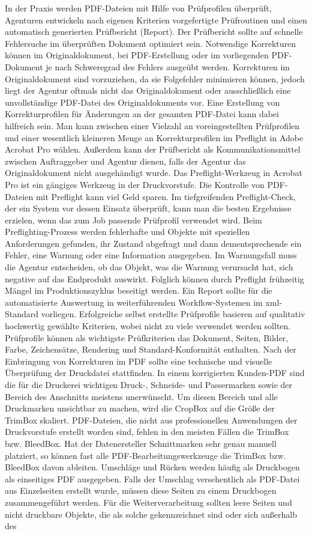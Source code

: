 In der Praxis werden PDF-Dateien mit Hilfe von Prüfprofilen überprüft, Agenturen entwickeln nach eigenen Kriterien vorgefertigte Prüfroutinen und einen automatisch generierten Prüfbericht (Report). Der Prüfbericht sollte auf schnelle Fehlersuche im überprüften Dokument optimiert sein. Notwendige Korrekturen können im Originaldokument, bei PDF-Erstellung oder im vorliegenden PDF-Dokument je nach Schweregrad des Fehlers ausgeübt werden. Korrekturen im Originaldokument sind vorzuziehen, da sie Folgefehler minimieren können, jedoch liegt der Agentur oftmals nicht das Originaldokument oder ausschließlich eine unvollständige PDF-Datei des Originaldokuments vor. Eine Erstellung von Korrekturprofilen für Änderungen an der gesamten PDF-Datei kann dabei hilfreich sein. Man kann zwischen einer Vielzahl an voreingestellten Prüfprofilen und einer wesentlich kleineren Menge an Korrekturprofilen im Preflight in Adobe Acrobat Pro wählen. Außerdem kann der Prüfbericht als Kommunikationsmittel zwischen Auftraggeber und Agentur dienen, falls der Agentur das Originaldokument nicht ausgehändigt wurde. Das Preflight-Werkzeug in Acrobat Pro ist ein gängiges Werkzeug in der Druckvorstufe. Die Kontrolle von PDF-Dateien mit Preflight kann viel Geld sparen. Im tiefgreifenden Preflight-Check, der ein System vor dessen Einsatz überprüft, kann man die besten Ergebnisse erzielen, wenn das zum Job passende Prüfprofil verwendet wird. Beim Preflighting-Prozess werden fehlerhafte und Objekte mit speziellen Anforderungen gefunden, ihr Zustand abgefragt und dann dementsprechende ein Fehler, eine Warnung oder eine Information ausgegeben. Im Warnungsfall muss die Agentur entscheiden, ob das Objekt, was die Warnung verursacht hat, sich negative auf das Endprodukt auswirkt. Folglich können durch Preflight frühzeitig Mängel im Produktionszyklus beseitigt werden. Ein Report sollte für die automatisierte Auswertung in weiterführenden Workflow-Systemen im \gls{xml}-Standard vorliegen. Erfolgreiche selbst erstellte Prüfprofile basieren auf qualitativ hochwertig gewählte Kriterien, wobei nicht zu viele verwendet werden sollten. Prüfprofile können als wichtigste Prüfkriterien das Dokument, Seiten, Bilder, Farbe, Zeichensätze, Rendering und Standard-Konformität enthalten. Nach der Einbringung von Korrekturen im PDF sollte eine technische und visuelle Überprüfung der Druckdatei stattfinden. In einem korrigierten Kunden-PDF sind die für die Druckerei wichtigen Druck-, Schneide- und Passermarken sowie der Bereich des Anschnitts meistens unerwünscht. Um diesen Bereich und alle Druckmarken unsichtbar zu machen, wird die CropBox auf die Größe der TrimBox skaliert. PDF-Dateien, die nicht aus professionellen Anwendungen der Druckvorstufe erstellt worden sind, fehlen in den meisten Fällen die TrimBox bzw. BleedBox. Hat der Datenersteller Schnittmarken sehr genau manuell platziert, so können fast alle PDF-Bearbeitungswerkzeuge die TrimBox bzw. BleedBox davon ableiten. Umschläge und Rücken werden häufig als Druckbogen als einseitiges PDF ausgegeben. Falls der Umschlag versehentlich als PDF-Datei aus Einzelseiten erstellt wurde, müssen diese Seiten zu einem Druckbogen zusammengeführt werden. Für die Weiterverarbeitung sollten leere Seiten und nicht druckbare Objekte, die als solche gekennzeichnet sind oder sich außerhalb des 